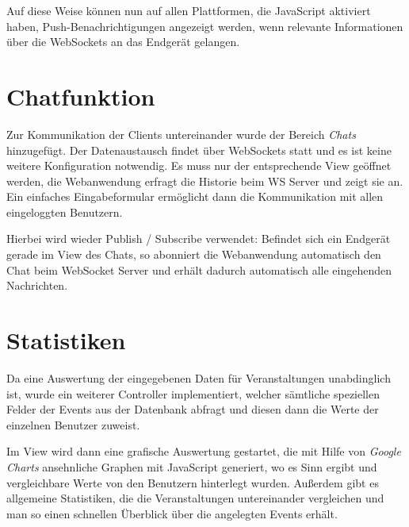 Auf diese Weise können nun auf allen Plattformen, die JavaScript aktiviert haben, Push-Benachrichtigungen angezeigt werden, wenn relevante Informationen über die WebSockets an das Endgerät gelangen.


\section{Chatfunktion}
Zur Kommunikation der Clients untereinander wurde der Bereich \emph{Chats} hinzugefügt. Der Datenaustausch findet über WebSockets statt und es ist keine weitere Konfiguration notwendig. Es muss nur der entsprechende View geöffnet werden, die Webanwendung erfragt die Historie beim WS Server und zeigt sie an. Ein einfaches Eingabeformular ermöglicht dann die Kommunikation mit allen eingeloggten Benutzern.\par

Hierbei wird wieder Publish / Subscribe verwendet: Befindet sich ein Endgerät gerade im View des Chats, so abonniert die Webanwendung automatisch den Chat beim WebSocket Server und erhält dadurch automatisch alle eingehenden Nachrichten.


\section{Statistiken}
Da eine Auswertung der eingegebenen Daten für Veranstaltungen unabdinglich ist, wurde ein weiterer Controller implementiert, welcher sämtliche speziellen Felder der Events aus der Datenbank abfragt und diesen dann die Werte der einzelnen Benutzer zuweist.\par

Im View wird dann eine grafische Auswertung gestartet, die mit Hilfe von \emph{Google Charts} \cite{google:charts} ansehnliche Graphen mit JavaScript generiert, wo es Sinn ergibt und vergleichbare Werte von den Benutzern hinterlegt wurden. Außerdem gibt es allgemeine Statistiken, die die Veranstaltungen untereinander vergleichen und man so einen schnellen Überblick über die angelegten Events erhält.